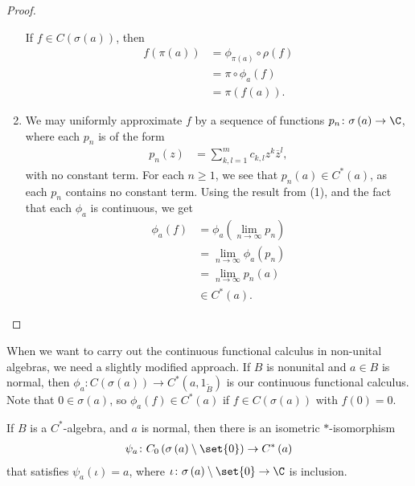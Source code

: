 \documentclass[10pt]{mypackage}
\begin{document}
\begin{proof}
\begin{enumerate}[(1)]
      If $f\in C\left(\sigma\left(a\right)\right)$, then
      \begin{align*}
        f\left(\pi\left(a\right)\right) &= \phi_{\pi\left(a\right)}\circ \rho\left(f\right)\\
                                        &= \pi\circ \phi_a\left(f\right)\\
                                        &= \pi\left(f\left(a\right)\right).
      \end{align*}
    \item We may uniformly approximate $f$ by a sequence of functions $p_n\colon \sigma\left(a\right)\rightarrow \C$, where each $p_n$ is of the form
      \begin{align*}
        p_n\left(z\right) &= \sum_{k,l=1}^{m}c_{k,l}z^k\overline{z}^{l},
      \end{align*}
      with no constant term. For each $n\geq 1$, we see that $p_n\left(a\right)\in C^{\ast}\left(a\right)$, as each $p_n$ contains no constant term. Using the result from (1), and the fact that each $\phi_{a}$ is continuous, we get
      \begin{align*}
        \phi_a\left(f\right) &= \phi_a\left(\lim_{n\rightarrow\infty}p_n\right)\\
                             &= \lim_{n\rightarrow\infty}\phi_a\left(p_n\right)\\
                             &= \lim_{n\rightarrow\infty}p_n\left(a\right)\\
                             &\in C^{\ast}\left(a\right).
      \end{align*}
  \end{enumerate}
\end{proof}
When we want to carry out the continuous functional calculus in non-unital algebras, we need a slightly modified approach. If $B$ is nonunital and $a\in B$ is normal, then $\phi_a\colon C\left(\sigma\left(a\right)\right)\rightarrow C^{\ast}\left(a,1_{\widetilde{B}}\right)$ is our continuous functional calculus. Note that $0\in\sigma\left(a\right)$, so $\phi_a\left(f\right)\in C^{\ast}\left(a\right)$ if $f\in C\left(\sigma\left(a\right)\right)$ with $f(0) = 0$.
\begin{corollary}
  If $B$ is a $C^{\ast}$-algebra, and $a$ is normal, then there is an isometric $\ast$-isomorphism
  \begin{align*}
    \psi_a\colon C_0\left(\sigma\left(a\right)\setminus \set{0}\right) \rightarrow C^{\ast}\left(a\right)
  \end{align*}
  that satisfies $\psi_a\left(\iota\right) = a$, where $\iota\colon \sigma\left(a\right)\setminus \set{0}\rightarrow \C$ is inclusion.
\end{corollary}
\end{document}

